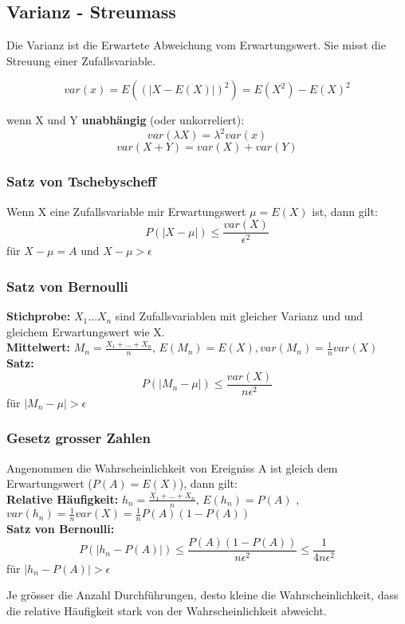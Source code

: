 \documentclass[margin=normal]{tex/hsrzf}
\begin{document}
\subsection{Varianz - Streumass}
\begin{multicols}{2}
    Die Varianz ist die Erwartete Abweichung vom Erwartungswert.
    Sie misst die Streuung einer Zufallsvariable.

    $$var(x) = E((|X-E(X)|)^2) = E(X^2) - E(X)^2$$

    wenn X und Y \textbf{unabhängig} (oder unkorreliert):
    $$var(\lambda X) = \lambda^2 var(x)$$
    $$var(X+Y) = var(X) + var(Y)$$

    \subsubsection*{Satz von Tschebyscheff}
    Wenn X eine Zufallsvariable mir Erwartungswert $\mu = E(X)$ ist, dann gilt:
    $$P(|X-\mu|)\leq \frac{var(X)}{\epsilon^2}$$
    für $X-\mu = A$ und $X-\mu > \epsilon$

    \subsubsection*{Satz von Bernoulli}
    \textbf{Stichprobe:} $X_1 \dots X_n$ sind Zufallsvariablen mit gleicher Varianz und und gleichem Erwartungswert wie X.
    \\ \textbf{Mittelwert:} $M_n = \frac{X_1+\dots+ X_n}{n}$, $E(M_n) = E(X), var(M_n) =\frac{1}{n} var(X)$
    \\ \textbf{Satz:} $$P(|M_n -\mu|) \leq \frac{var(X)}{n\epsilon^2} $$
    für $|M_n -\mu| > \epsilon$
    \subsubsection*{Gesetz grosser Zahlen}
    Angenommen die Wahrscheinlichkeit von Ereigniss A ist gleich dem Erwartungswert ($P(A) = E(X)$), dann gilt:
    \\ \textbf{Relative Häufigkeit:} $h_n = \frac{X_1+ \dots + X_n}{n}$, $E(h_n) = P(A)$ , $ var(h_n) = \frac{1}{n} var(X) = \frac{1}{n}P(A)(1-P(A))$
    \\ \textbf{Satz von Bernoulli:}
    $$P(|h_n - P(A)|) \leq \frac{P(A)(1-P(A))}{n\epsilon^2} \leq \frac{1}{4n\epsilon^2} $$
    für $|h_n - P(A)| > \epsilon$

    \tiny{Je grösser die Anzahl Durchführungen, desto kleine die Wahrscheinlichkeit, dass die relative Häufigkeit stark von der Wahrscheinlichkeit abweicht.}
\end{multicols}
\end{document}
